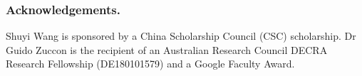 \documentclass[runningheads]{llncs}
\begin{document}
\begin{abstract}

\end{abstract}












\makeatletter
\renewcommand{\@biblabel}[1]{\hfill #1.}
\makeatother

\subsubsection*{Acknowledgements.} Shuyi Wang is sponsored by a China Scholarship Council (CSC) scholarship. Dr Guido Zuccon is the recipient of an Australian Research Council DECRA Research Fellowship (DE180101579) and a Google Faculty Award. 






\end{document}
